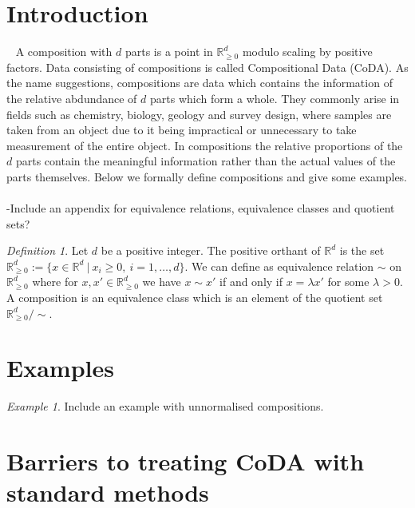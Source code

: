 \documentclass[BSc]{usydthesis}
\numberwithin{equation}{chapter}
\theoremstyle{remark}
\newtheorem{Definition}[equation]{Definition}
\newtheorem{Example}[equation]{Example}
\begin{document}
\section{Introduction}
\
\newline
A composition with $d$ parts is a point in $\mathbb{R}^d_{\geq 0}$ modulo scaling by positive factors. Data consisting of compositions is called Compositional Data (CoDA). As the name suggestions, compositions are data which contains the information of the relative abdundance of $d$ parts which form a whole. They commonly arise in fields such as chemistry, biology, geology and survey design, where samples are taken from an object due to it being impractical or unnecessary to take measurement of the entire object. In compositions the relative proportions of the $d$ parts contain the meaningful information rather than the actual values of the parts themselves. Below we formally define compositions and give some examples. \
\\
-Include an appendix for equivalence relations, equivalence classes and quotient sets?

\begin{Definition}
Let $d$ be a positive integer. The positive orthant of $\mathbb{R}^d$ is the set $\mathbb{R}^d_{\geq 0 } := \{ x \in \mathbb{R}^d \ | \ x_i \geq 0, \ i=1,\ldots, d\}.$ We can define as equivalence relation $\sim$ on $\mathbb{R}^d_{\geq 0}$ where for $x, x' \in \mathbb{R}^d_{\geq 0}$ we have $x \sim x'$ if and only if $x = \lambda x'$ for some $\lambda > 0.$ A composition is an equivalence class which is an element of the quotient set $\mathbb{R}^d_{\geq 0}/\sim. $  
\end{Definition}

\section{Examples}

\begin{Example}
Include an example with unnormalised compositions. 
\end{Example}

\section{Barriers to treating CoDA with standard methods}
\end{document}

